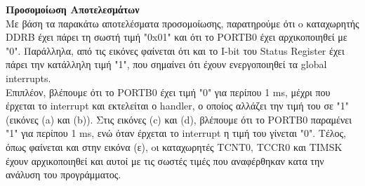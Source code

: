 \documentclass{article}
\begin{document}
\pagebreak
\noindent
\textbf{Προσομοίωση Αποτελεσμάτων} \\
\noindent
Mε βάση τα παρακάτω αποτελέσματα προσομοίωσης, παρατηρούμε ότι o καταχωρητής DDRB έχει πάρει τη σωστή τιμή "0x01" και ότι το PORTB0 έχει αρχικοποιηθεί με "0". Παράλληλα, από τις εικόνες φαίνεται ότι και το I-bit του Status Register έχει πάρει την κατάλληλη τιμή "1", που σημαίνει ότι έχουν ενεργοποιηθεί τα global interrupts.\\

\noindent
Eπιπλέον, βλέπουμε ότι το PORTB0 έχει τιμή "0" για περίπου 1 ms, μέχρι που έρχεται το interrupt και εκτελείται ο handler, ο οποίος αλλάζει την τιμή του σε "1" (εικόνες (a) και (b)). Στις εικόνες (c) και (d), βλέπουμε ότι το PORTB0 παραμένει "1" για περίπου 1 ms, ενώ όταν έρχεται το interrupt η τιμή του γίνεται "0". Τέλος, όπως φαίνεται και στην εικόνα (ε), oι καταχωρητές TCNT0, TCCR0 και TIMSK έχουν αρχικοποιηθεί και αυτοί με τις σωστές τιμές που αναφέρθηκαν κατα την ανάλυση του προγράμματος. 
\end{document}
